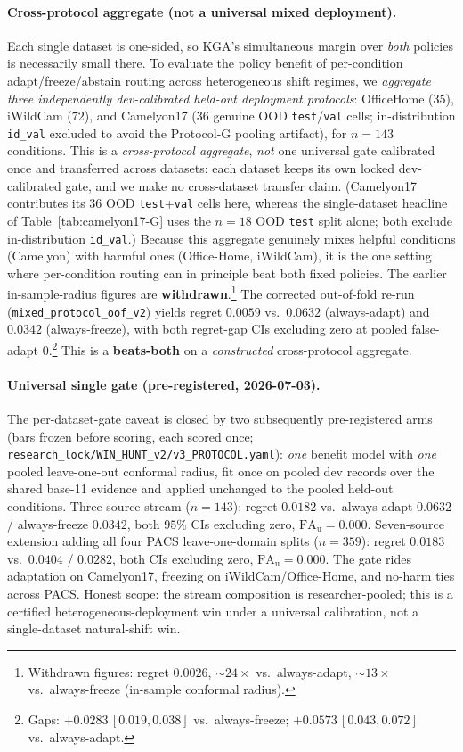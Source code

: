 \documentclass[conference]{IEEEtran}
\theoremstyle{plain}
\theoremstyle{definition}
\theoremstyle{remark}
\begin{document}
\paragraph{Cross-protocol aggregate (not a universal mixed deployment).}
Each single dataset is one-sided, so \textsc{KGA}'s simultaneous margin over \emph{both} policies is
necessarily small there. To evaluate the policy benefit of per-condition adapt/freeze/abstain
routing across heterogeneous shift regimes, we \emph{aggregate three independently dev-calibrated
held-out deployment protocols}: OfficeHome ($35$), iWildCam ($72$), and Camelyon17 ($36$ genuine OOD
\texttt{test}/\texttt{val} cells; in-distribution \texttt{id\_val} excluded to avoid the Protocol-G
pooling artifact), for $n{=}143$ conditions. This is a \emph{cross-protocol aggregate}, \emph{not}
one universal gate calibrated once and transferred across datasets: each dataset keeps its own
locked dev-calibrated gate, and we make no cross-dataset transfer claim. (Camelyon17 contributes its
$36$ OOD \texttt{test}+\texttt{val} cells here, whereas the single-dataset headline of
Table~\ref{tab:camelyon17-G} uses the $n{=}18$ OOD \texttt{test} split alone; both exclude
in-distribution \texttt{id\_val}.) Because this aggregate genuinely mixes helpful conditions
(Camelyon) with harmful ones (Office-Home, iWildCam), it is the one setting where per-condition
routing can in principle beat both fixed policies. The earlier in-sample-radius figures are
\textbf{withdrawn}.\footnote{Withdrawn figures: regret $0.0026$, ${\sim}24\times$ vs.\
always-adapt, ${\sim}13\times$ vs.\ always-freeze (in-sample conformal radius).} The corrected
out-of-fold re-run (\texttt{mixed\_protocol\_oof\_v2}) yields regret $0.0059$ vs.\ $0.0632$
(always-adapt) and $0.0342$ (always-freeze), with both regret-gap CIs excluding zero at pooled
false-adapt $0$.\footnote{Gaps: $+0.0283\,[0.019,0.038]$ vs.\ always-freeze;
$+0.0573\,[0.043,0.072]$ vs.\ always-adapt.} This is a \textbf{beats-both} on a \emph{constructed}
cross-protocol aggregate.

\paragraph{Universal single gate (pre-registered, 2026-07-03).} The per-dataset-gate caveat is
closed by two subsequently pre-registered arms (bars frozen before scoring, each scored once;
\texttt{research\_lock/WIN\_HUNT\_v2/v3\_PROTOCOL.yaml}): \emph{one} benefit model with
\emph{one} pooled leave-one-out conformal radius, fit once on pooled dev records over the shared
base-11 evidence and applied unchanged to the pooled held-out conditions. Three-source stream
($n{=}143$): regret $0.0182$ vs.\ always-adapt $0.0632$ / always-freeze $0.0342$, both $95\%$
CIs excluding zero, $\mathrm{FA}_{\mathrm u}{=}0.000$. Seven-source extension adding all four
PACS leave-one-domain splits ($n{=}359$): regret $0.0183$ vs.\ $0.0404$ / $0.0282$, both CIs
excluding zero, $\mathrm{FA}_{\mathrm u}{=}0.000$. The gate rides adaptation on Camelyon17,
freezing on iWildCam/Office-Home, and no-harm ties across PACS. Honest scope: the stream
composition is researcher-pooled; this is a certified heterogeneous-deployment win under a
universal calibration, not a single-dataset natural-shift win.
\end{document}
